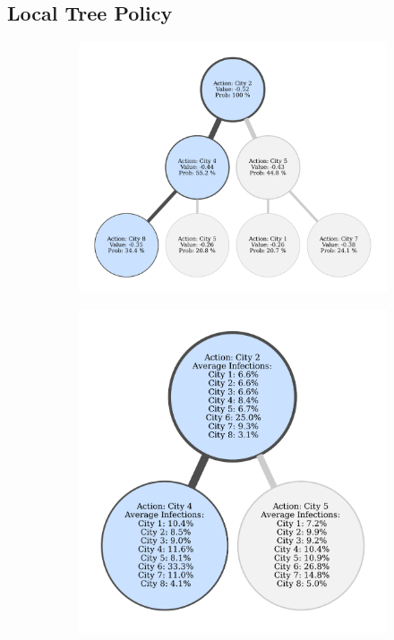 \documentclass[letterpaper]{article} %
\begin{document}
\subsection{Local Tree Policy}
\begin{figure}[ht!]
\centering
\begin{subfigure}[t]{0.56\textwidth}
\centering
\includegraphics[width=\textwidth]{figs/vaccine_graph.pdf}
\caption{}\label{fig: detail a}
\end{subfigure}
\begin{subfigure}[t]{0.43\textwidth}
\centering
\includegraphics[width=\textwidth]{figs/vaccine_detail_graph.pdf}

\end{subfigure}
\end{figure}
\end{document}
